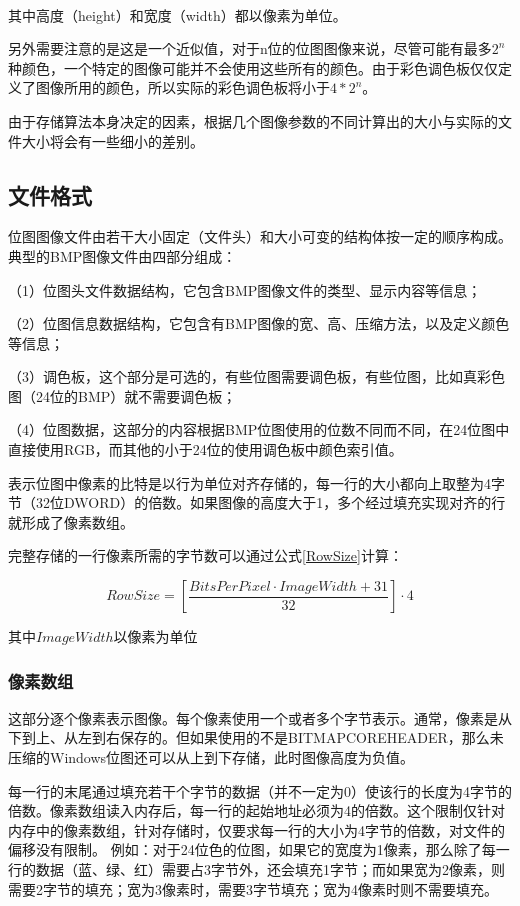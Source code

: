\documentclass[UTF8]{ctexart}
\newcommand{\upcite}[1]{\textsuperscript{\textsuperscript{\cite{#1}}}}
\begin{document}
其中高度（height）和宽度（width）都以像素为单位\upcite{Wiki}。

另外需要注意的是这是一个近似值，对于n位的位图图像来说，尽管可能有最多$2^n$种颜色，一个特定的图像可能并不会使用这些所有的颜色。由于彩色调色板仅仅定义了图像所用的颜色，所以实际的彩色调色板将小于$4*2^n$。

由于存储算法本身决定的因素，根据几个图像参数的不同计算出的大小与实际的文件大小将会有一些细小的差别。

\subsection{文件格式}

位图图像文件由若干大小固定（文件头）和大小可变的结构体按一定的顺序构成。典型的BMP图像文件由四部分组成：

（1）位图头文件数据结构，它包含BMP图像文件的类型、显示内容等信息；

（2）位图信息数据结构，它包含有BMP图像的宽、高、压缩方法，以及定义颜色等信息；

（3）调色板，这个部分是可选的，有些位图需要调色板，有些位图，比如真彩色图（24位的BMP）就不需要调色板；

（4）位图数据，这部分的内容根据BMP位图使用的位数不同而不同，在24位图中直接使用RGB，而其他的小于24位的使用调色板中颜色索引值。

表示位图中像素的比特是以行为单位对齐存储的，每一行的大小都向上取整为4字节（32位DWORD）的倍数。如果图像的高度大于1，多个经过填充实现对齐的行就形成了像素数组。

完整存储的一行像素所需的字节数可以通过公式\ref{RowSize}计算：

\begin{equation}\label{RowSize}
    RowSize = [ \frac{BitsPerPixel \cdot ImageWidth + 31}{32} ] \cdot 4
\end{equation}

其中$ImageWidth$以像素为单位

\subsubsection{像素数组}

这部分逐个像素表示图像。每个像素使用一个或者多个字节表示。通常，像素是从下到上、从左到右保存的。但如果使用的不是BITMAPCOREHEADER，那么未压缩的Windows位图还可以从上到下存储，此时图像高度为负值。

每一行的末尾通过填充若干个字节的数据（并不一定为0）使该行的长度为4字节的倍数。像素数组读入内存后，每一行的起始地址必须为4的倍数。这个限制仅针对内存中的像素数组，针对存储时，仅要求每一行的大小为4字节的倍数，对文件的偏移没有限制。
例如：对于24位色的位图，如果它的宽度为1像素，那么除了每一行的数据（蓝、绿、红）需要占3字节外，还会填充1字节；而如果宽为2像素，则需要2字节的填充；宽为3像素时，需要3字节填充；宽为4像素时则不需要填充。
\end{document}
